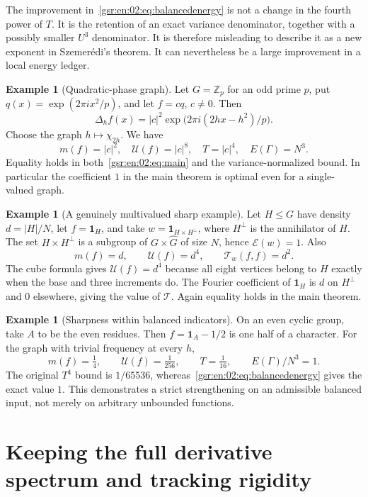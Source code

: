 \documentclass[11pt,letterpaper]{article}
\numberwithin{equation}{section}
\theoremstyle{definition}
\newtheorem{example}[theorem]{Example}
\theoremstyle{remark}
\newcommand{\Z}{\mathbb Z}
\newcommand{\one}{\mathbf 1}
\newcommand{\1}{\mathbf 1}
\newcommand{\U}{\mathcal U}
\newcommand{\calE}{\mathcal E}
\newcommand{\calT}{\mathcal T}
\newcommand{\srctag}[1]{\texorpdfstring{\enspace\textup{[#1]}}{ [#1]}}
\newcommand{\srcnote}[2]{\par\noindent{\small\textit{Source #1, delivered #2.}}\par}
\begin{document}
The improvement in~\eqref{gsr:en:02:eq:balancedenergy} is not a change in the fourth power of $T$. It is the retention of an exact variance denominator, together with a possibly smaller $U^3$ denominator. It is therefore misleading to describe it as a new exponent in Szemer\'edi's theorem. It can nevertheless be a large improvement in a local energy ledger.

\begin{example}[Quadratic-phase graph]\label{gsr:en:02:ex:quadratic}
Let $G=\Z_p$ for an odd prime $p$, put $q(x)=\exp(2\pi i x^2/p)$, and let $f=cq$, $c\ne0$. Then
\[
 \Delta_hf(x)=|c|^2\exp\bigl(2\pi i(2hx-h^2)/p\bigr).
\]
Choose the graph $h\mapsto\chi_{2h}$. We have
\[
 m(f)=|c|^2,\quad \U(f)=|c|^8,\quad T=|c|^4,
 \quad E(\Gamma)=N^3.
\]
Equality holds in both~\eqref{gsr:en:02:eq:main} and the variance-normalized bound. In particular the coefficient $1$ in the main theorem is optimal even for a single-valued graph.
\end{example}

\begin{example}[A genuinely multivalued sharp example]\label{gsr:en:02:ex:rectangle}
Let $H\leq G$ have density $d=|H|/N$, let $f=\one_H$, and take $w=\one_{H\times H^\perp}$, where $H^\perp$ is the annihilator of $H$. The set $H\times H^\perp$ is a subgroup of $G\times\widehat G$ of size $N$, hence $\calE(w)=1$. Also
\[
 m(f)=d,\qquad \U(f)=d^4,\qquad \calT_w(f,f)=d^2.
\]
The cube formula gives $\U(f)=d^4$ because all eight vertices belong to $H$ exactly when the base and three increments do. The Fourier coefficient of $\one_H$ is $d$ on $H^\perp$ and $0$ elsewhere, giving the value of $\calT$. Again equality holds in the main theorem.
\end{example}

\begin{example}[Sharpness within balanced indicators]\label{gsr:en:02:ex:balanced}
On an even cyclic group, take $A$ to be the even residues. Then $f=\one_A-1/2$ is one half of a character. For the graph with trivial frequency at every $h$,
\[
 m(f)=\tfrac14,\qquad \U(f)=\tfrac1{256},\qquad
 T=\tfrac1{16},\qquad E(\Gamma)/N^3=1.
\]
The original $T^4$ bound is $1/65536$, whereas~\eqref{gsr:en:02:eq:balancedenergy} gives the exact value $1$. This demonstrates a strict strengthening on an admissible balanced input, not merely on arbitrary unbounded functions.
\end{example}

\section[{Keeping the full derivative spectrum and tracking rigidity\srctag{02}}]{Keeping the full derivative spectrum and tracking rigidity}\label{gsr:en:02:sec:d5}
\srcnote{02}{Section 5}
\end{document}
